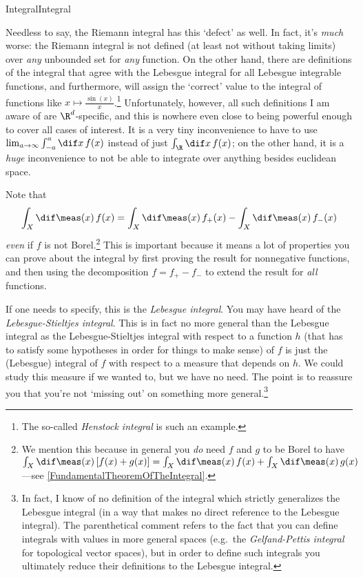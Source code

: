 \begin{dfn}{Integral}{Integral}
\begin{rmk}
Needless to say, the Riemann integral has this `defect' as well.  In fact, it's \emph{much} worse:  the Riemann integral is not defined (at least not without taking limits) over \emph{any} unbounded set for \emph{any} function.  On the other hand, there are definitions of the integral that agree with the Lebesgue integral for all Lebesgue integrable functions, and furthermore, will assign the `correct' value to the integral of functions like $x\mapsto \frac{\sin (x)}{x}$.\footnote{The so-called \emph{Henstock integral} is such an example.}  Unfortunately, however, all such definitions I am aware of are $\R ^d$-specific, and this is nowhere even close to being powerful enough to cover all cases of interest.  It is a very tiny inconvenience to have to use $\lim _{a\to \infty}\int _{-a}^a\dif x\, f(x)$ instead of just $\int _{\R}\dif x\, f(x)$; on the other hand, it is a \emph{huge} inconvenience to not be able to integrate over anything besides euclidean space.
\end{rmk}
\begin{rmk}
Note that
\begin{equation}
\int _X\dif \meas (x)\, f(x)=\int _X\dif \meas (x)\, f_+(x)-\int _X\dif \meas (x)\, f_-(x)
\end{equation}
\emph{even} if $f$ is not Borel.\footnote{We mention this because in general you \emph{do} need $f$ and $g$ to be Borel to have $\int _X\dif \meas (x)\, [f(x)+g(x)]=\int _X\dif \meas (x)\, f(x)+\int _X\dif \meas (x)\, g(x)$---see \cref{FundamentalTheoremOfTheIntegral}.}  This is important because it means a lot of properties you can prove about the integral by first proving the result for nonnegative functions, and then using the decomposition $f=f_+-f_-$ to extend the result for \emph{all} functions.
\end{rmk}
\begin{rmk}
If one needs to specify, this is the \emph{Lebesgue integral}.  You may have heard of the \emph{Lebesgue-Stieltjes integral}.  This is in fact no more general than the Lebesgue integral as the Lebesgue-Stieltjes integral with respect to a function $h$ (that has to satisfy some hypotheses in order for things to make sense) of $f$ is just the (Lebesgue) integral of $f$ with respect to a measure that depends on $h$.  We could study this measure if we wanted to, but we have no need.  The point is to reassure you that you're not `missing out' on something more general.\footnote{In fact, I know of no definition of the integral which strictly generalizes the Lebesgue integral (in a way that makes no direct reference to the Lebesgue integral).  The parenthetical comment refers to the fact that you can define integrals with values in more general spaces (e.g.~the \emph{Gelfand-Pettis integral} for topological vector spaces), but in order to define such integrals you ultimately reduce their definitions to the Lebesgue integral.}
\end{rmk}
\end{dfn}
